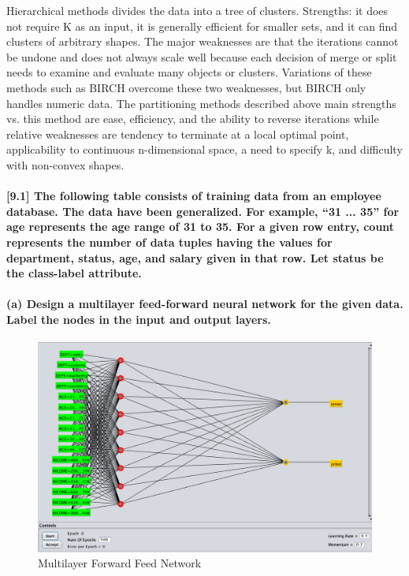 \documentclass[11pt]{article}
\makeatletter
\def\maxwidth{\ifdim\Gin@nat@width>\linewidth\linewidth
    \else\Gin@nat@width\fi}
\let\Oldincludegraphics\includegraphics
\renewcommand{\includegraphics}[1]{\Oldincludegraphics[width=.8\maxwidth]{#1}}
\makeatother
\begin{document}
    Hierarchical methods divides the data into a tree of clusters.
Strengths: it does not require K as an input, it is generally efficient
for smaller sets, and it can find clusters of arbitrary shapes. The
major weaknesses are that the iterations cannot be undone and does not
always scale well because each decision of merge or split needs to
examine and evaluate many objects or clusters. Variations of these
methods such as BIRCH overcome these two weaknesses, but BIRCH only
handles numeric data. The partitioning methods described above main
strengths vs. this method are ease, efficiency, and the ability to
reverse iterations while relative weaknesses are tendency to terminate
at a local optimal point, applicability to continuous n-dimensional
space, a need to specify k, and difficulty with non-convex shapes.

    \paragraph{{[}9.1{]} The following table consists of training data from
an employee database. The data have been generalized. For example, ``31
... 35'' for age represents the age range of 31 to 35. For a given row
entry, count represents the number of data tuples having the values for
department, status, age, and salary given in that row. Let status be the
class-label
attribute.}\label{the-following-table-consists-of-training-data-from-an-employee-database.-the-data-have-been-generalized.-for-example-31-...-35-for-age-represents-the-age-range-of-31-to-35.-for-a-given-row-entry-count-represents-the-number-of-data-tuples-having-the-values-for-department-status-age-and-salary-given-in-that-row.-let-status-be-the-class-label-attribute.}

    \paragraph{(a) Design a multilayer feed-forward neural network for the
given data. Label the nodes in the input and output
layers.}\label{a-design-a-multilayer-feed-forward-neural-network-for-the-given-data.-label-the-nodes-in-the-input-and-output-layers.}

    \begin{figure}
\centering
\includegraphics{mlp.png}
\caption{Multilayer Forward Feed Network}
\end{figure}
\end{document}
